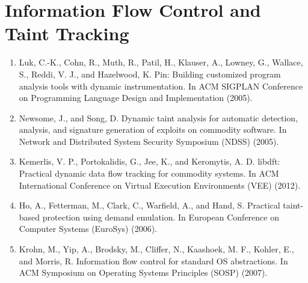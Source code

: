 \section{Information Flow Control and Taint Tracking}

\begin{enumerate}[resume]
\item Luk, C.-K., Cohn, R., Muth, R., Patil, H., Klauser, A., Lowney, G., Wallace, S., Reddi, V. J., and Hazelwood, K. Pin: Building customized program analysis tools with dynamic instrumentation. In ACM SIGPLAN Conference on Programming Language Design and Implementation (2005).
\item  Newsome, J., and Song, D. Dynamic taint analysis for automatic detection, analysis, and signature generation of exploits on commodity software. In Network and Distributed System Security Symposium (NDSS) (2005).
\item Kemerlis, V. P., Portokalidis, G., Jee, K., and Keromytis, A. D. libdft: Practical dynamic data flow tracking for commodity systems. In ACM International Conference on Virtual Execution Environments (VEE) (2012).
\item Ho, A., Fetterman, M., Clark, C., Warfield, A., and Hand, S. Practical taint-based protection using demand emulation. In European Conference on Computer Systems (EuroSys) (2006).
\item Krohn, M., Yip, A., Brodsky, M., Cliffer, N., Kaashoek, M. F., Kohler, E., and Morris, R. Information flow control for standard OS abstractions. In ACM Symposium on Operating Systems Principles (SOSP) (2007).
\end{enumerate}

